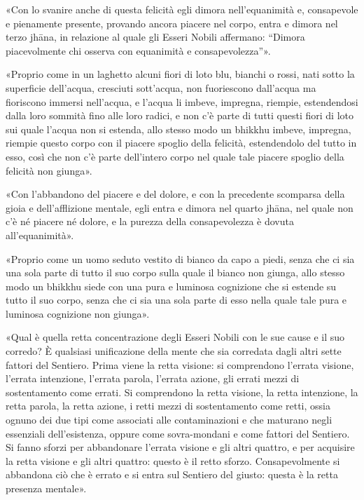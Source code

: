 
«Con lo svanire anche di questa felicità egli dimora nell’equanimità e,
consapevole e pienamente presente, provando ancora piacere nel corpo, entra e
dimora nel terzo jhāna, in relazione al quale gli Esseri Nobili affermano:
“Dimora piacevolmente chi osserva con equanimità e consapevolezza”».


«Proprio come in un laghetto alcuni fiori di loto blu, bianchi o rossi, nati
sotto la superficie dell’acqua, cresciuti sott’acqua, non fuoriescono dall’acqua
ma fioriscono immersi nell’acqua, e l’acqua li imbeve, impregna, riempie,
estendendosi dalla loro sommità fino alle loro radici, e non c’è parte di tutti
questi fiori di loto sui quale l’acqua non si estenda, allo stesso modo un
bhikkhu imbeve, impregna, riempie questo corpo con il piacere spoglio della
felicità, estendendolo del tutto in esso, così che non c’è parte dell’intero
corpo nel quale tale piacere spoglio della felicità non giunga».


«Con l’abbandono del piacere e del dolore, e con la precedente scomparsa della
gioia e dell’afflizione mentale, egli entra e dimora nel quarto jhāna, nel quale
non c’è né piacere né dolore, e la purezza della consapevolezza è dovuta
all’equanimità».


«Proprio come un uomo seduto vestito di bianco da capo a piedi, senza che ci sia
una sola parte di tutto il suo corpo sulla quale il bianco non giunga, allo
stesso modo un bhikkhu siede con una pura e luminosa cognizione che si estende
su tutto il suo corpo, senza che ci sia una sola parte di esso nella quale tale
pura e luminosa cognizione non giunga».


«Qual è quella retta concentrazione degli Esseri Nobili con le sue cause e il
suo corredo? È qualsiasi unificazione della mente che sia corredata dagli altri
sette fattori del Sentiero. Prima viene la retta visione: si comprendono
l’errata visione, l’errata intenzione, l’errata parola, l’errata azione, gli
errati mezzi di sostentamento come errati. Si comprendono la retta visione, la
retta intenzione, la retta parola, la retta azione, i retti mezzi di
sostentamento come retti, ossia ognuno dei due tipi come associati alle
contaminazioni e che maturano negli essenziali dell’esistenza, oppure come
sovra-mondani e come fattori del Sentiero. Si fanno sforzi per abbandonare
l’errata visione e gli altri quattro, e per acquisire la retta visione e gli
altri quattro: questo è il retto sforzo. Consapevolmente si abbandona ciò che è
errato e si entra sul Sentiero del giusto: questa è la retta presenza mentale».

